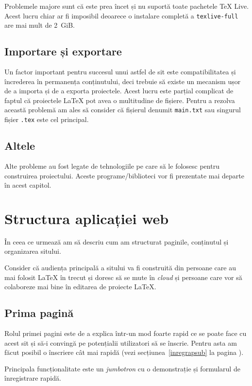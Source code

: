 \documentclass[a4wide,12pt]{report}
\newcommand{\eng}[1]{\emph{#1}} %
\newcommand{\cod}[1]{\texttt{#1}}
\begin{document}
Problemele majore sunt că este prea încet și nu suportă toate pachetele \TeX{}
Live. Acest lucru chiar ar fi imposibil deoarece o instalare completă a
\cod{texlive-full} are mai mult de 2~GiB.

\subsection{Importare și exportare}

Un factor important pentru succesul unui astfel de sit este compatibilitatea și
încrederea în permanența conținutului, deci trebuie să existe un mecanism ușor
de a importa și de a exporta proiectele. Acest lucru este parțial complicat de
faptul că proiectele \LaTeX{} pot avea o multitudine de fișiere. Pentru a
rezolva această problemă am ales să consider că fișierul denumit \cod{main.txt}
sau singurul fișier \cod{.tex} este cel principal.

\subsection{Altele}

Alte probleme au fost legate de tehnologiile pe care să le folosesc pentru
construirea proiectului. Aceste programe/biblioteci vor fi prezentate mai departe
în acest capitol.

\section{Structura aplicației web}

În ceea ce urmează am să descriu cum am structurat paginile, conținutul și
organizarea sitului.

Consider că audiența principală a sitului va fi construită din persoane care au
mai folosit \LaTeX{} în trecut și doresc să se mute în \eng{cloud} și persoane
care vor să colaboreze mai bine în editarea de proiecte \LaTeX{}.

\subsection{Prima pagină}

Rolul primei pagini este de a explica într-un mod foarte rapid ce se poate face
cu acest sit și să-i convingă pe potențialii utilizatori să se înscrie. Pentru
asta am făcut posibil o înscriere cât mai rapidă (vezi
secțiunea~\ref{inregrapsub} la pagina \pageref{inregrapsub}).

Principala funcționalitate este un \eng{jumbotron} cu o demonstrație și
formularul de înregistrare rapidă.
\end{document}
